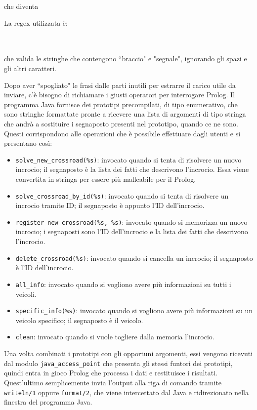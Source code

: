 \mbox{}
\begin{flushleft}
	che diventa
\end{flushleft}
\par \mbox{}

\begin{flushleft}
	La regex utilizzata è:
\end{flushleft}

\par \mbox{} \\\\
che valida le stringhe che contengono ``braccio" e "segnale", ignorando gli spazi e gli altri caratteri.

Dopo aver ``spogliato" le frasi dalle parti inutili per estrarre il carico utile da inviare, c'è bisogno di richiamare i giusti operatori per interrogare Prolog. Il programma Java fornisce dei prototipi precompilati, di tipo enumerativo, che sono stringhe formattate pronte a ricevere una lista di argomenti di tipo stringa che andrà a sostituire i segnaposto presenti nel prototipo, quando ce ne sono. Questi corrispondono alle operazioni che è possibile effettuare dagli utenti e si presentano così:
\begin{itemize}
	\item \texttt{solve\_new\_crossroad(\%s)}: invocato quando si tenta di risolvere un nuovo incrocio; il segnaposto è la lista dei fatti che descrivono l'incrocio. Essa viene convertita in stringa per essere più malleabile per il Prolog.
	\item \texttt{solve\_crossroad\_by\_id(\%s)}: invocato quando si tenta di risolvere un incrocio tramite ID; il segnaposto è appunto l'ID dell'incrocio.
	\item \texttt{register\_new\_crossroad(\%s, \%s)}: invocato quando si memorizza un nuovo incrocio; i segnaposti sono l'ID dell'incrocio e la lista dei fatti che descrivono l'incrocio.
	\item \texttt{delete\_crossroad(\%s)}: invocato quando si cancella un incrocio; il segnaposto è l'ID dell'incrocio.
	\item \texttt{all\_info}: invocato quando si vogliono avere più informazioni su tutti i veicoli.
	\item \texttt{specific\_info(\%s)}: invocato quando si vogliono avere più informazioni su un veicolo specifico; il segnaposto è il veicolo.
	\item \texttt{clean}: invocato quando si vuole togliere dalla memoria l'incrocio.
\end{itemize}

Una volta combinati i prototipi con gli opportuni argomenti, essi vengono ricevuti dal modulo \texttt{java\_access\_point} che presenta gli stessi funtori dei prototipi, quindi entra in gioco Prolog che processa i dati e restituisce i risultati. Quest'ultimo semplicemente invia l'output alla riga di comando tramite \texttt{writeln/1} oppure \texttt{format/2}, che viene intercettato dal Java e ridirezionato nella finestra del programma Java.

